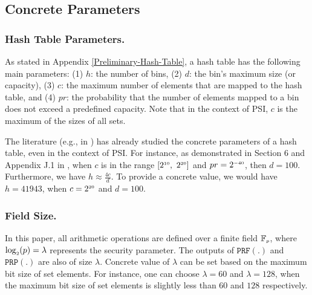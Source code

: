 


\subsection{Concrete Parameters}\label{sec::conc-parameters}

\subsubsection{Hash Table Parameters.}

As stated in Appendix \ref{Preliminary-Hash-Table}, a hash table has the following main parameters: (1) $h$: the number of bins, (2) $d$: the bin’s maximum size (or capacity), (3) $c$: the maximum number of elements that are mapped to the hash table, and (4) $pr$: the probability that the number of elements mapped to a bin does not exceed a predefined capacity. Note that in the context of PSI, $c$ is the maximum of the sizes of all sets.

The literature (e.g., in \cite{Feather2020-full,DBLP:conf/ccs/KolesnikovMPRT17,DBLP:conf/uss/Pinkas0SZ15}) has already studied the concrete parameters of a hash table, even in the context of PSI. For instance, as demonstrated in Section 6 and Appendix J.1 in \cite{Feather2020-full}, when $c$ is in the range $[2^{\scriptscriptstyle 10},\ 2^{\scriptscriptstyle 20}]$ and $pr=2^{\scriptscriptstyle -40}$, then $d=100$. Furthermore, we have $h\approx\frac{4c}{d}$. To provide a concrete value, we would have $h=41943$, when $c=2^{\scriptscriptstyle 20}$ and $d=100$. 

\subsubsection{Field Size.} 
%
In this paper, all arithmetic operations are defined over a finite field $\mathbb{F}_{\scriptscriptstyle p}$, where $\log_{\scriptscriptstyle 2}(p)=\lambda$ represents the security parameter. The outputs of $\mathtt {PRF}(.)$ and  $\mathtt {PRP}(.) $ are also of size $\lambda$. Concrete value of $\lambda$ can be set based on the maximum bit size of set elements. For instance, one can choose $\lambda = 60$ and $\lambda = 128$, when the maximum bit size of set elements is slightly less than $60$ and $128$ respectively. 




